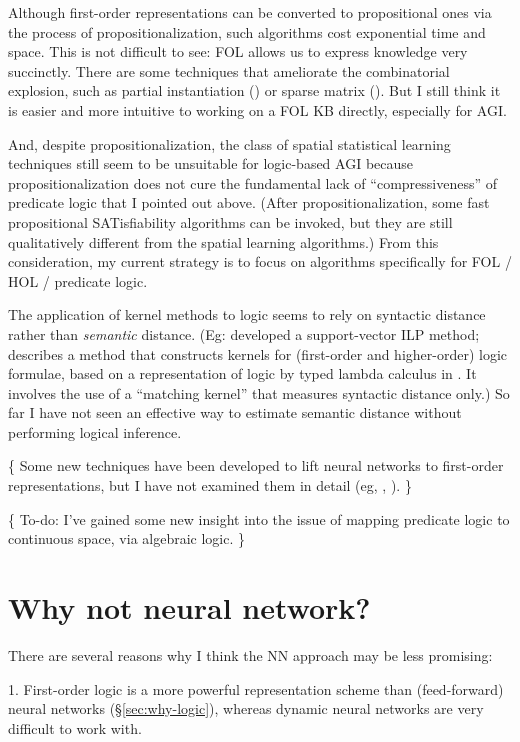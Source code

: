 Although first-order representations can be converted to propositional ones via the process of propositionalization, such algorithms cost exponential time and space.  This is not difficult to see:  FOL allows us to express knowledge very succinctly.  There are some techniques that ameliorate the combinatorial explosion, such as partial instantiation (\citep*{Chandru1999}) or sparse matrix (\citep*{Domingos2008}).  But I still think it is easier and more intuitive to working on a FOL KB directly, especially for AGI.

And, despite propositionalization, the class of spatial statistical learning techniques still seem to be unsuitable for logic-based AGI because propositionalization does not cure the fundamental lack of ``compressiveness'' of predicate logic that I pointed out above.  (After propositionalization, some fast propositional SATisfiability algorithms can be invoked, but they are still qualitatively different from the spatial learning algorithms.)  From this consideration, my current strategy is to focus on algorithms specifically for FOL / HOL / predicate logic.

The application of kernel methods to logic seems to rely on syntactic distance rather than \textit{semantic} distance.  (Eg: \citep*{Muggleton2005} developed a support-vector ILP method;  \citep*{Gartner2008} describes a method that constructs kernels for (first-order and higher-order) logic formulae, based on a representation of logic by typed lambda calculus in \citep*{Lloyd2003}.  It involves the use of a ``matching kernel'' that measures syntactic distance only.)  So far I have not seen an effective way to estimate semantic distance without performing logical inference.

\{ Some new techniques have been developed to lift neural networks to first-order representations, but I have not examined them in detail (eg, \citep*{Garcez2009}, \citep*{Hammer2007}).  \}

\{ To-do:  I've gained some new insight into the issue of mapping predicate logic to continuous space, via algebraic logic. \}

\section{Why not neural network?}

There are several reasons why I think the NN approach may be less promising:

1.  First-order logic is a more powerful representation scheme than (feed-forward) neural networks (\S\ref{sec:why-logic}), whereas dynamic neural networks are very difficult to work with.

